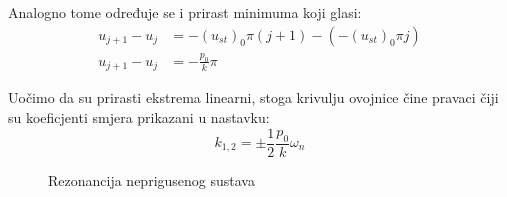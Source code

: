 Analogno tome određuje se i prirast minimuma koji glasi:
\begin{equation}\label{eq:prirast_minimuma}
    \begin{split}
        u_{j+1}-u_j &= -(u_{st})_0\pi(j+1)-(-(u_{st})_0\pi j)\\
        u_{j+1}-u_j &= -\frac{p_0}{k}\pi
    \end{split}
\end{equation}

Uočimo da su prirasti ekstrema linearni, stoga krivulju ovojnice čine pravaci čiji
su koeficjenti smjera prikazani u nastavku:
\begin{equation}\label{eq:koef_smjera_envelopa}
    k_{1,2}=\pm\frac{1}{2}\frac{p_0}{k}\omega_n
\end{equation}

\begin{figure}[H]
    
    \label{rezonanca-nepriguseno}
    \caption{Rezonancija neprigusenog sustava}
\end{figure}


